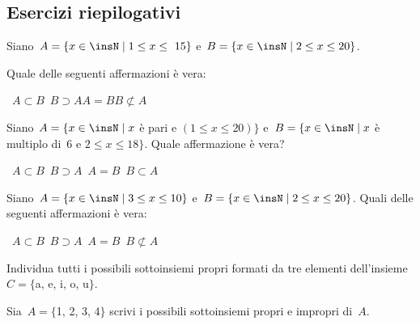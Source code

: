 \subsection{Esercizi riepilogativi}

\begin{esercizio}
Siano~$A=\{x\in\insN\mid 1\le x\le~15\}$ e~$B=\{x\in\insN\mid 2\le x\le 20\}$.
\begin{center}

\end{center}
Quale delle seguenti affermazioni è vera:
\begin{center}
\boxA\quad~$A\subset B$\quad\boxB\quad~$B\supset A$\quad\boxC\quad$A=B$\quad\boxD\quad$B\not\subset A$
\end{center}
\end{esercizio}

\begin{esercizio}
 Siano~$A=\{x\in\insN\mid x$ è pari e $(1\le x\le 20)\}$ e~$B=\{x\in\insN\mid x$ è multiplo di~6 e $2\le x\le 18\}$.
Quale affermazione è vera?
\begin{center}
 \boxA\quad~$A\subset B$\quad\boxB\quad~$B\supset A$\quad\boxC\quad~$A=B$\quad\boxD\quad~$B\subset A$
\end{center}
\end{esercizio}

\begin{esercizio}
Siano~$A=\{x\in\insN\mid 3\le x\le 10\}$ e~$B=\{x\in\insN\mid 2\le x\le 20\}$.
Quali delle seguenti affermazioni è vera:
\begin{center}
 \boxA\quad~$A\subset B$\quad\boxB\quad~$B\supset A$\quad\boxC\quad~$A=B$\quad\boxD\quad~$B\not\subset A$
\end{center}
\end{esercizio}

\begin{esercizio}
Individua tutti i possibili sottoinsiemi propri formati da tre elementi dell'insieme~$C=\{$a, e, i, o, u$\}$.
\end{esercizio}

\begin{esercizio}
Sia~$A=\{$1, 2, 3, 4$\}$ scrivi i possibili sottoinsiemi propri e impropri di~$A$.
\end{esercizio}

